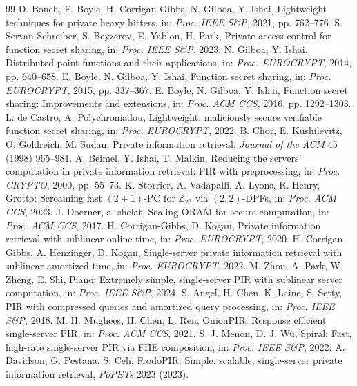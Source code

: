\documentclass[11pt,a4paper]{article}
\begin{document}
\begin{thebibliography}{99}
 D. Boneh, E. Boyle, H. Corrigan-Gibbs, N. Gilboa, Y. Ishai, Lightweight techniques for private heavy hitters, in: \textit{Proc. IEEE S\&P}, 2021, pp. 762--776.
 S. Servan-Schreiber, S. Beyzerov, E. Yablon, H. Park, Private access control for function secret sharing, in: \textit{Proc. IEEE S\&P}, 2023.
 N. Gilboa, Y. Ishai, Distributed point functions and their applications, in: \textit{Proc. EUROCRYPT}, 2014, pp. 640--658.
 E. Boyle, N. Gilboa, Y. Ishai, Function secret sharing, in: \textit{Proc. EUROCRYPT}, 2015, pp. 337--367.
 E. Boyle, N. Gilboa, Y. Ishai, Function secret sharing: Improvements and extensions, in: \textit{Proc. ACM CCS}, 2016, pp. 1292--1303.
 L. de Castro, A. Polychroniadou, Lightweight, maliciously secure verifiable function secret sharing, in: \textit{Proc. EUROCRYPT}, 2022.
 B. Chor, E. Kushilevitz, O. Goldreich, M. Sudan, Private information retrieval, \textit{Journal of the ACM} 45 (1998) 965--981.
 A. Beimel, Y. Ishai, T. Malkin, Reducing the servers' computation in private information retrieval: PIR with preprocessing, in: \textit{Proc. CRYPTO}, 2000, pp. 55--73.
 K. Storrier, A. Vadapalli, A. Lyons, R. Henry, Grotto: Screaming fast $(2+1)$-PC for $\mathbb{Z}_{2^n}$ via $(2,2)$-DPFs, in: \textit{Proc. ACM CCS}, 2023.
 J. Doerner, a. shelat, Scaling ORAM for secure computation, in: \textit{Proc. ACM CCS}, 2017.
 H. Corrigan-Gibbs, D. Kogan, Private information retrieval with sublinear online time, in: \textit{Proc. EUROCRYPT}, 2020.
 H. Corrigan-Gibbs, A. Henzinger, D. Kogan, Single-server private information retrieval with sublinear amortized time, in: \textit{Proc. EUROCRYPT}, 2022.
 M. Zhou, A. Park, W. Zheng, E. Shi, Piano: Extremely simple, single-server PIR with sublinear server computation, in: \textit{Proc. IEEE S\&P}, 2024.
 S. Angel, H. Chen, K. Laine, S. Setty, PIR with compressed queries and amortized query processing, in: \textit{Proc. IEEE S\&P}, 2018.
 M. H. Mughees, H. Chen, L. Ren, OnionPIR: Response efficient single-server PIR, in: \textit{Proc. ACM CCS}, 2021.
 S. J. Menon, D. J. Wu, Spiral: Fast, high-rate single-server PIR via FHE composition, in: \textit{Proc. IEEE S\&P}, 2022.
 A. Davidson, G. Pestana, S. Celi, FrodoPIR: Simple, scalable, single-server private information retrieval, \textit{PoPETs} 2023 (2023).

\end{thebibliography}
\end{document}
